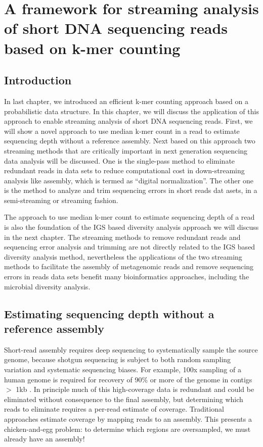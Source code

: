 \chapter{A framework for streaming analysis of short DNA sequencing reads based
on k-mer counting}

\section{Introduction}

In last chapter, we introduced an efficient k-mer counting approach based on a
probabilistic data structure. In this chapter, we will discuss the application
of this approach to enable streaming analysis of short DNA sequencing reads.
First, we will show a novel approach to use median k-mer count in a read to estimate
sequencing depth without a reference assembly. Next based on this approach two
streaming methods that are critically important in next generation sequencing
data analysis will be discussed. One is the single-pass method to eliminate redundant reads in
data sets to reduce computational cost in down-streaming analysis like
assembly, which is termed as ``digital normalization''. The other one is the
method to analyze and trim sequencing errors in short reads dat asets, in a
semi-streaming or streaming fashion.

The approach to use median k-mer count to estimate sequencing depth of a read is
also the foundation of the IGS based diversity analysis approach we will
discuss in the next chapter. The streaming methods to remove redundant reads
and sequencing error analysis and trimming are not directly related to the IGS
based diversity analysis method, nevertheless the applications of the two
streaming methods to facilitate the assembly of metagenomic reads and remove
sequencing errors in reads data sets benefit many bioinformatics approaches,
including the microbial diversity analysis.
% 
\section{Estimating sequencing depth without a reference assembly}

Short-read assembly requires deep sequencing to systematically sample the
source genome, because shotgun sequencing is subject to both random sampling
variation and systematic sequencing biases.  For example, 100x sampling of a
human genome is required for recovery of 90\% or more of the genome in contigs
$>$ 1kb \cite{pubmed21187386}. In principle much of this high-coverage data is
redundant and could be eliminated without consequence to the final assembly,
but determining which reads to eliminate requires a per-read estimate of
coverage. Traditional approaches estimate coverage by mapping reads to an
assembly.  This presents a chicken-and-egg problem: to determine which regions
are oversampled, we must already have an assembly!

